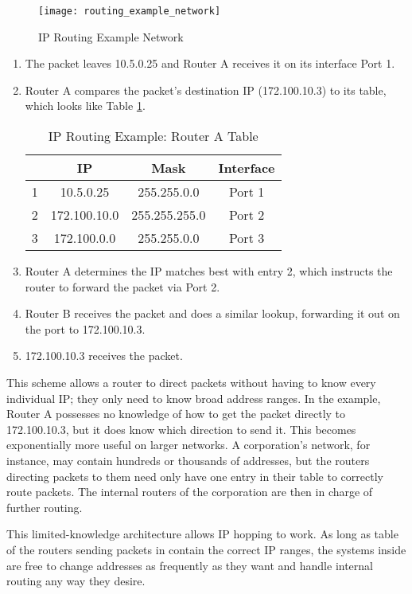 \begin{figure}
\caption{\ac{IP} Routing Example Network}
\label{fig:routing_example_network}
\centering
\texttt{[image: routing\_example\_network]}
\end{figure}

\begin{enumerate}[1.]
\item The packet leaves 10.5.0.25 and Router A receives it on its interface Port 1.
\item Router A compares the packet's destination \ac{IP} (172.100.10.3) to its table, which looks like Table \ref{tbl:routing_example_routera_table}.
	\begin{table}[h]
	\caption{\ac{IP} Routing Example: Router A Table}
	\label{tbl:routing_example_routera_table}
	\centering
	\begin{tabular}{r|c|c|c}
	 & \textbf{\ac{IP}} & \textbf{Mask} & \textbf{Interface}\\
	\hline
	1 & 10.5.0.25 & 255.255.0.0 & Port 1\\
	2 & 172.100.10.0 & 255.255.255.0 & Port 2\\
	3 & 172.100.0.0 & 255.255.0.0 & Port 3\\
	\end{tabular}
	\end{table}
\item Router A determines the \ac{IP} matches best with entry 2, which instructs the router to forward the packet via Port 2.
\item Router B receives the packet and does a similar lookup, forwarding it out on the port to 172.100.10.3.
\item 172.100.10.3 receives the packet.
\end{enumerate}

\par This scheme allows a router to direct packets without having to know every individual IP; they only need to know broad address ranges. In the example, Router A possesses no knowledge of how to get the packet directly to 172.100.10.3, but it does know which direction to send it. This becomes exponentially more useful on larger networks. A corporation's network, for instance, may contain hundreds or thousands of addresses, but the routers directing packets to them need only have one entry in their table to correctly route packets. The internal routers of the corporation are then in charge of further routing.

\par This limited-knowledge architecture allows IP hopping to work. As long as table of the routers sending packets in contain the correct \ac{IP} ranges, the systems inside are free to change addresses as frequently as they want and handle internal routing any way they desire.

